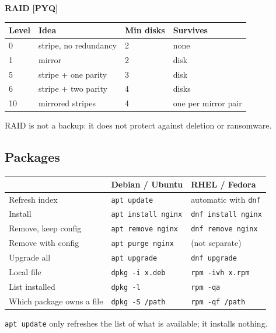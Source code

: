\documentclass[11pt,a4paper]{article}
\newcommand{\pyq}{\textcolor{ember}{\scriptsize\textbf{[PYQ]}}}
\begin{document}
\textbf{RAID} \pyq{}

\begin{center}\small\renewcommand{\arraystretch}{1.18}\setlength{\tabcolsep}{9pt}
\begin{tabularx}{\linewidth}{@{}l>{\raggedright\arraybackslash}Xl>{\raggedright\arraybackslash}X@{}}
\toprule
\textbf{\color{slate}Level} & \textbf{\color{slate}Idea} & \textbf{\color{slate}Min disks} & \textbf{\color{slate}Survives} \\ \midrule
0 & stripe, no redundancy & 2 & none \\
1 & mirror & 2 & 1 disk \\
5 & stripe + one parity & 3 & 1 disk \\
6 & stripe + two parity & 4 & 2 disks \\
10 & mirrored stripes & 4 & one per mirror pair \\
\bottomrule
\end{tabularx}\end{center}
RAID is not a backup: it does not protect against deletion or ransomware.

\subsection{Packages}
\begin{center}\small\renewcommand{\arraystretch}{1.18}\setlength{\tabcolsep}{9pt}
\begin{tabularx}{\linewidth}{@{}>{\raggedright\arraybackslash}X>{\raggedright\arraybackslash}X>{\raggedright\arraybackslash}X@{}}
\toprule
\textbf{\color{slate}} & \textbf{\color{slate}Debian / Ubuntu} & \textbf{\color{slate}RHEL / Fedora} \\ \midrule
Refresh index & \texttt{apt update} & automatic with \texttt{dnf} \\
Install & \texttt{apt install nginx} & \texttt{dnf install nginx} \\
Remove, keep config & \texttt{apt remove nginx} & \texttt{dnf remove nginx} \\
Remove with config & \texttt{apt purge nginx} & (not separate) \\
Upgrade all & \texttt{apt upgrade} & \texttt{dnf upgrade} \\
Local file & \texttt{dpkg -i x.deb} & \texttt{rpm -ivh x.rpm} \\
List installed & \texttt{dpkg -l} & \texttt{rpm -qa} \\
Which package owns a file & \texttt{dpkg -S /path} & \texttt{rpm -qf /path} \\
\bottomrule
\end{tabularx}\end{center}
\texttt{apt update} only refreshes the list of what is available; it installs nothing.
\end{document}
